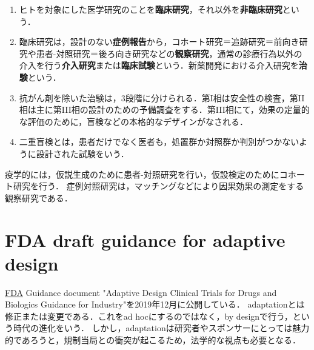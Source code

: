 \documentclass[uplatex,dvipdfmx]{jsreport}
\begin{document}
\begin{definition}\mbox{}
    \begin{enumerate}
        \item ヒトを対象にした医学研究のことを\textbf{臨床研究}，それ以外を\textbf{非臨床研究}という．
        \item 臨床研究は，設計のない\textbf{症例報告}から，コホート研究＝追跡研究＝前向き研究や患者-対照研究＝後ろ向き研究などの\textbf{観察研究}，通常の診療行為以外の介入を行う\textbf{介入研究}または\textbf{臨床試験}という．新薬開発における介入研究を\textbf{治験}という．
        \item 抗がん剤を除いた治験は，3段階に分けられる．第I相は安全性の検査，第II相は主に第III相の設計のための予備調査をする．第III相にて，効果の定量的な評価のために，盲検などの本格的なデザインがなされる．
        \item 二重盲検とは，患者だけでなく医者も，処置群か対照群か判別がつかないように設計された試験をいう．
    \end{enumerate}
\end{definition}
\begin{remark}
    疫学的には，仮説生成のために患者-対照研究を行い，仮設検定のためにコホート研究を行う．
    症例対照研究は，マッチングなどにより因果効果の測定をする観察研究である．
\end{remark}

\section{FDA draft guidance for adaptive design}

\begin{tcolorbox}[colframe=ForestGreen, colback=ForestGreen!10!white,breakable,colbacktitle=ForestGreen!40!white,coltitle=black,fonttitle=\bfseries\sffamily,
title=]
    \href{https://www.fda.gov/regulatory-information/search-fda-guidance-documents/adaptive-design-clinical-trials-drugs-and-biologics-guidance-industry}{FDA}
    Guidance document "Adaptive Design Clinical Trials for Drugs and Biologics Guidance for Industry"を2019年12月に公開している．
    adaptationとは修正または変更である．これをad hocにするのではなく，by designで行う，という時代の進化をいう．
    しかし，adaptationは研究者やスポンサーにとっては魅力的であろうと，規制当局との衝突が起こるため，法学的な視点も必要となる．
\end{tcolorbox}
\end{document}
